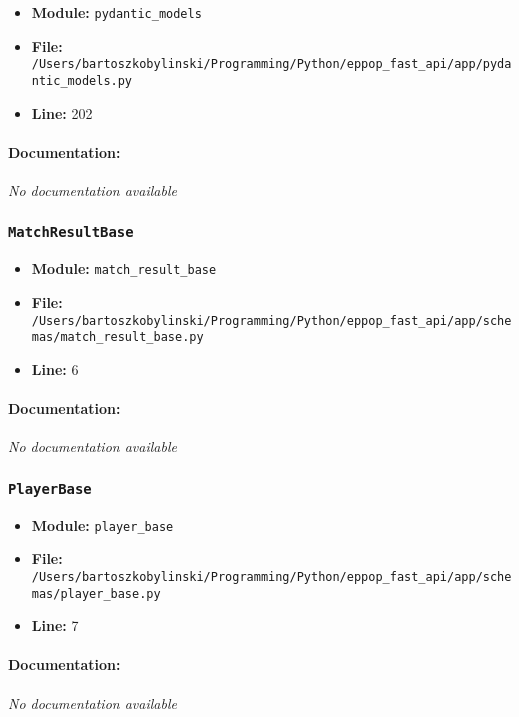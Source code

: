 \documentclass[11pt,a4paper]{article}
\begin{document}
\begin{itemize}
    \item \textbf{Module:} \texttt{pydantic\_models}
    \item \textbf{File:} \texttt{/Users/bartoszkobylinski/Programming/Python/eppop\_fast\_api/app/pydantic\_models.py}
    \item \textbf{Line:} 202
\end{itemize}

\paragraph{Documentation:} \textit{No documentation available}


\vspace{1em}
\subsubsection{\texttt{MatchResultBase}}

\begin{itemize}
    \item \textbf{Module:} \texttt{match\_result\_base}
    \item \textbf{File:} \texttt{/Users/bartoszkobylinski/Programming/Python/eppop\_fast\_api/app/schemas/match\_result\_base.py}
    \item \textbf{Line:} 6
\end{itemize}

\paragraph{Documentation:} \textit{No documentation available}


\vspace{1em}
\subsubsection{\texttt{PlayerBase}}

\begin{itemize}
    \item \textbf{Module:} \texttt{player\_base}
    \item \textbf{File:} \texttt{/Users/bartoszkobylinski/Programming/Python/eppop\_fast\_api/app/schemas/player\_base.py}
    \item \textbf{Line:} 7
\end{itemize}

\paragraph{Documentation:} \textit{No documentation available}
\end{document}
